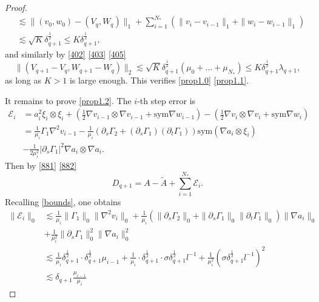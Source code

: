 \documentclass[10pt,a4paper]{amsart}
\newcommand{\E}{\mathcal{E}}
\newcommand{\sym}{\text{sym}}
\begin{document}
\begin{proof}
\begin{equation}
\begin{aligned}
    &\lesssim \|(v_0,w_0)-(V_q,W_q)\|_1+\sum_{i=1}^{N_*}(\|v_i-v_{i-1}\|_1+\|w_i-w_{i-1}\|_1)\\
    &\lesssim\sqrt{K}\delta_{q+1}^\frac{1}{2}
    \le K\delta_{q+1}^\frac{1}{2},
\end{aligned}
\end{equation}
and similarly by \eqref{402} \eqref{403} \eqref{405}
\begin{equation}\label{K2}
    \|(V_{q+1}-V_q, W_{q+1}-W_q)\|_2\lesssim \sqrt{K}\delta_{q+1}^\frac{1}{2}(\mu_0+...+\mu_{N_*})
    \le K\delta_{q+1}^\frac{1}{2}\lambda_{q+1},
\end{equation}
as long as $K>1$ is large enough. This verifies \eqref{prop1.0} \eqref{prop1.1}. 

It remains to prove \eqref{prop1.2}. The $i$-th step error is
\begin{align*}
    {\E}_i
    &={a}_i^2 \xi_i\otimes \xi_i
    +(\frac{1}{2}\nabla  {v}_{i-1}\otimes\nabla  {v}_{i-1}+\sym\nabla   {w}_{i-1})
    -(\frac{1}{2}\nabla  {v}_i\otimes\nabla  {v}_i+\sym\nabla   {w}_i)\\
    & =\frac{1}{ {\mu}_i}\Gamma_1\nabla^2  {v}_{i-1}
    -\frac{1}{ {\mu}_i}(\partial_{s}\Gamma_2+(\partial_{s}\Gamma_1)(\partial_{t}\Gamma_1))\sym(\nabla {a}_i\otimes \xi_i)\\
    & -\frac{1}{2 {\mu}_i^2}|\partial_{s}\Gamma_1|^2\nabla {a}_i\otimes\nabla {a}_i.
\end{align*}
Then by \eqref{881} \eqref{882}
\begin{equation}
    D_{q+1}=A-\tilde A+\sum_{i=1}^{N_*}\E_i.
\end{equation}
Recalling \eqref{bounds}, one obtains
\begin{equation}
\begin{aligned}
    \|\E_i\|_0
    &\lesssim\frac{1}{\mu_i}\|\Gamma_1\|_0\|\nabla^2 v_i\|_0 +\frac{1}{\mu_i}(\|\partial_s\Gamma_2\|_0+\|\partial_s\Gamma_1\|_0\|\partial_t\Gamma_1\|_0)\|\nabla a_i\|_0\\
    &+\frac{1}{\mu_i^2}\|\partial_s\Gamma_1\|_0^2\|\nabla a_i\|_0^2\\
    &\lesssim\frac{1}{\mu_i}\delta_{q+1}^\frac{1}{2}\cdot \delta_{q+1}^\frac{1}{2}\mu_{i-1}
    + \frac{1}{\mu_i}\cdot\delta_{q+1}^\frac{1}{2}\cdot\sigma\delta_{q+1}^\frac{1}{2}l^{-1}
    +\frac{1}{\mu_i^2}(\sigma\delta_{q+1}^\frac{1}{2}l^{-1})^2\\
    &\lesssim \delta_{q+1}\frac{\mu_{i-1}}{\mu_i}
\end{aligned}
\end{equation}

\end{proof}
\end{document}
